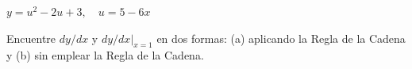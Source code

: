 \item $y = u^2 - 2u + 3, \quad u = 5 - 6x$
\par
Encuentre $dy/dx$ y $dy/dx|_{x=1}$ en dos formas: (a) aplicando la Regla de la Cadena y (b) sin emplear la Regla de la Cadena.

